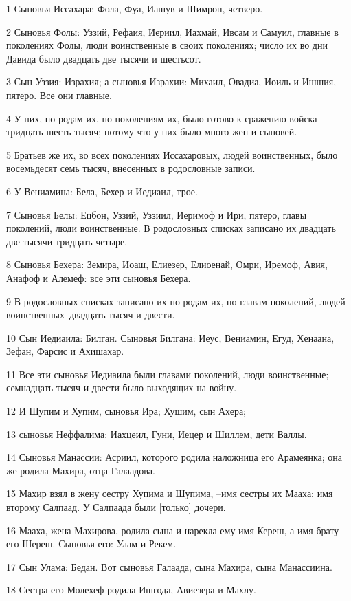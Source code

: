 \par 1 Сыновья Иссахара: Фола, Фуа, Иашув и Шимрон, четверо.
\par 2 Сыновья Фолы: Уззий, Рефаия, Иериил, Иахмай, Ивсам и Самуил, главные в поколениях Фолы, люди воинственные в своих поколениях; число их во дни Давида было двадцать две тысячи и шестьсот.
\par 3 Сын Уззия: Израхия; а сыновья Израхии: Михаил, Овадиа, Иоиль и Ишшия, пятеро. Все они главные.
\par 4 У них, по родам их, по поколениям их, было готово к сражению войска тридцать шесть тысяч; потому что у них было много жен и сыновей.
\par 5 Братьев же их, во всех поколениях Иссахаровых, людей воинственных, было восемьдесят семь тысяч, внесенных в родословные записи.
\par 6 У Вениамина: Бела, Бехер и Иедиаил, трое.
\par 7 Сыновья Белы: Ецбон, Уззий, Уззиил, Иеримоф и Ири, пятеро, главы поколений, люди воинственные. В родословных списках записано их двадцать две тысячи тридцать четыре.
\par 8 Сыновья Бехера: Земира, Иоаш, Елиезер, Елиоенай, Омри, Иремоф, Авия, Анафоф и Алемеф: все эти сыновья Бехера.
\par 9 В родословных списках записано их по родам их, по главам поколений, людей воинственных--двадцать тысяч и двести.
\par 10 Сын Иедиаила: Билган. Сыновья Билгана: Иеус, Вениамин, Егуд, Хенаана, Зефан, Фарсис и Ахишахар.
\par 11 Все эти сыновья Иедиаила были главами поколений, люди воинственные; семнадцать тысяч и двести было выходящих на войну.
\par 12 И Шупим и Хупим, сыновья Ира; Хушим, сын Ахера;
\par 13 сыновья Неффалима: Иахцеил, Гуни, Иецер и Шиллем, дети Валлы.
\par 14 Сыновья Манассии: Асриил, которого родила наложница его Арамеянка; она же родила Махира, отца Галаадова.
\par 15 Махир взял в жену сестру Хупима и Шупима, --имя сестры их Мааха; имя второму Салпаад. У Салпаада были [только] дочери.
\par 16 Мааха, жена Махирова, родила сына и нарекла ему имя Кереш, а имя брату его Шереш. Сыновья его: Улам и Рекем.
\par 17 Сын Улама: Бедан. Вот сыновья Галаада, сына Махира, сына Манассиина.
\par 18 Сестра его Молехеф родила Ишгода, Авиезера и Махлу.
